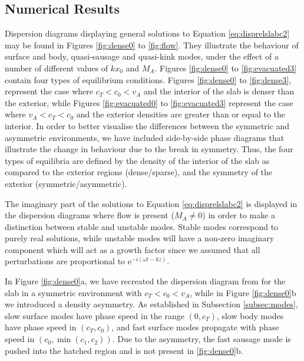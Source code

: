 \subsection{Numerical Results}
\label{subsec:numresults}

Dispersion diagrams displaying general solutions to Equation \eqref{eq:disprelslabc2} may be found in Figures \ref{fig:dense0} to \ref{fig:flow}.
They illustrate the behaviour of surface and body, quasi-sausage and quasi-kink modes, under the effect of a number of different values of $k x_0$ and $M_A$.
Figures \ref{fig:dense0} to \ref{fig:evacuated3} contain four types of equilibrium conditions.
Figures \ref{fig:dense0} to \ref{fig:dense3}, represent the case where $c_T < c_0 < v_A$ and the interior of the slab is denser than the exterior, while Figures \ref{fig:evacuated0} to \ref{fig:evacuated3} represent the case where $v_A < c_T < c_0$ and the exterior densities are greater than or equal to the interior.
In order to better visualise the differences between the symmetric and asymmetric environments, we have included side-by-side phase diagrams that illustrate the change in behaviour due to the break in symmetry.
Thus, the four types of equilibria are defined by the density of the interior of the slab as compared to the exterior regions (dense/sparse), and the symmetry of the exterior (symmetric/asymmetric).

The imaginary part of the solutions to Equation \eqref{eq:disprelslabc2} is displayed in the dispersion diagrams where flow is present ($M_A \neq 0$) in order to make a distinction between stable and unstable modes.
Stable modes correspond to purely real solutions, while unstable modes will have a non-zero imaginary component which will act as a growth factor since we assumed that all perturbations are proportional to $\mathrm{e}^{-i (\omega t - k z)}$.

In Figure \ref{fig:dense0}a, we have recreated the dispersion diagram from \cite{Roberts1981b} for the slab in a symmetric environment with $c_T < c_0 < v_A$, while in Figure \ref{fig:dense0}b we introduced a density asymmetry.
As established in Subsection \ref{subsec:modes}, slow surface modes have phase speed in the range $(0, c_T)$, slow body modes have phase speed in $(c_T, c_0)$, and fast surface modes propagate with phase speed in $(c_0, \min(c_1, c_2))$.
Due to the asymmetry, the fast sausage mode is pushed into the hatched region and is not present in \ref{fig:dense0}b.

